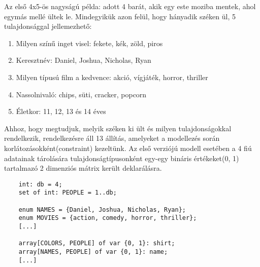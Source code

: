 \documentclass[12pt,a4paper,twoside, openright]{report}
\begin{document}
    Az első 4x5-ös nagyságú példa: adott 4 barát, akik egy este moziba mentek, ahol egymás mellé ültek le.
    Mindegyikük azon felül, hogy hányadik széken ül, 5 tulajdonsággal jellemezhető:
    \begin{enumerate}
    	\item Milyen színű inget visel: fekete, kék, zöld, piros
    	\item Keresztnév: Daniel, Joshua, Nicholas, Ryan
    	\item Milyen típusú film a kedvence: akció, vígjáték, horror, thriller
    	\item Nassolnivaló: chips, süti, cracker, popcorn
    	\item Életkor: 11, 12, 13 és 14 éves
    \end{enumerate}
    Ahhoz, hogy megtudjuk, melyik széken ki ült és milyen tulajdonságokkal rendelkezik, rendelkezésre áll 13 állítás, amelyeket a modellezés során korlátozásokként(constraint) kezeltünk.
    Az első verziójú modell esetében a 4 fiú adatainak tárolására tulajdonságtípusonként egy-egy bináris értékeket(0, 1) tartalmazó 2 dimenziós mátrix került deklarálásra.

    
    \begin{lstlisting}
    int: db = 4;
    set of int: PEOPLE = 1..db;
    
    enum NAMES = {Daniel, Joshua, Nicholas, Ryan};
    enum MOVIES = {action, comedy, horror, thriller};
    [...]
    
    array[COLORS, PEOPLE] of var {0, 1}: shirt;
    array[NAMES, PEOPLE] of var {0, 1}: name;
    [...]\end{lstlisting}
\end{document}
